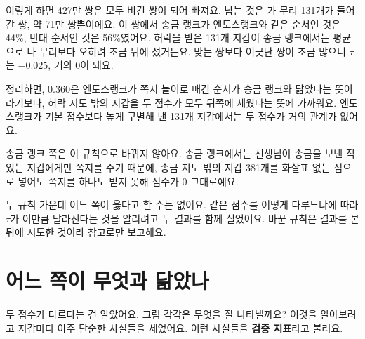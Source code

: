 \begin{deeper}[0.360을 조금 더 들여다보기]
\begin{center}
\end{center}

이렇게 하면 427만 쌍은 모두 비긴 쌍이 되어 빠져요.
남는 것은 가 무리 131개가 들어간 쌍, 약 71만 쌍뿐이에요.
이 쌍에서 송금 랭크가 엔도스랭크와 같은 순서인 것은 44\%, 반대 순서인 것은 56\%였어요.
허락을 받은 131개 지갑이 송금 랭크에서는 평균으로 나 무리보다 오히려 조금 뒤에 섰거든요.
맞는 쌍보다 어긋난 쌍이 조금 많으니 $\tau$는 $-0.025$, 거의 0이 돼요.

정리하면, 0.360은 엔도스랭크가 쪽지 놀이로 매긴 순서가 송금 랭크와 닮았다는 뜻이라기보다, 허락 지도 밖의 지갑을 두 점수가 모두 뒤쪽에 세웠다는 뜻에 가까워요.
엔도스랭크가 기본 점수보다 높게 구별해 낸 131개 지갑에서는 두 점수가 거의 관계가 없어요.

송금 랭크 쪽은 이 규칙으로 바뀌지 않아요.
송금 랭크에서는 선생님이 송금을 보낸 적 있는 지갑에게만 쪽지를 주기 때문에, 송금 지도 밖의 지갑 381개를 화살표 없는 점으로 넣어도 쪽지를 하나도 받지 못해 점수가 0 그대로예요.

두 규칙 가운데 어느 쪽이 옳다고 할 수는 없어요.
같은 점수를 어떻게 다루느냐에 따라 $\tau$가 이만큼 달라진다는 것을 알리려고 두 결과를 함께 실었어요.
바꾼 규칙은 결과를 본 뒤에 시도한 것이라 참고로만 보고해요.
\end{deeper}

\section{어느 쪽이 무엇과 닮았나}

두 점수가 다르다는 건 알았어요.
그럼 각각은 무엇을 잘 나타낼까요?
이것을 알아보려고 지갑마다 아주 단순한 사실들을 세었어요.
이런 사실들을 \textbf{검증 지표}라고 불러요.

